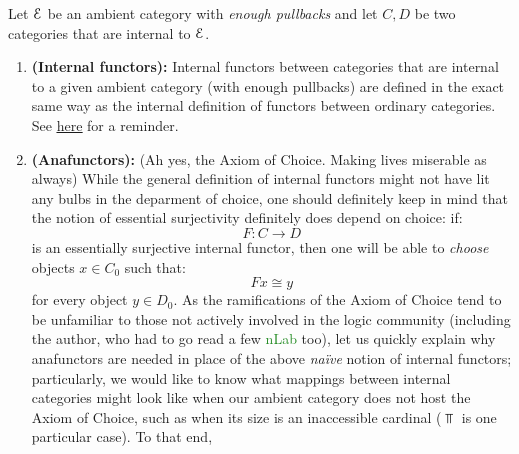                     \begin{definition} \label{def: internal_functors}
                        Let $\mathcal{E}$ be an ambient category with \textit{enough pullbacks} and let $C, D$ be two categories that are internal to $\mathcal{E}$.
                            \begin{enumerate}
                                \item \textbf{(Internal functors):} Internal functors between categories that are internal to a given ambient category (with enough pullbacks) are defined in the exact same way as the internal definition of functors between ordinary categories. See \href{https://ncatlab.org/nlab/show/functor#InternalDefinition}{\underline{here}} for a reminder.
                                \item \textbf{(Anafunctors):} (Ah yes, the Axiom of Choice. Making lives miserable as always) While the general definition of internal functors might not have lit any bulbs in the deparment of choice, one should definitely keep in mind that the notion of essential surjectivity definitely does depend on choice: if:
                                    $$F: C \to D$$
                                is an essentially surjective internal functor, then one will be able to \textit{choose} objects $x \in C_0$ such that:
                                    $$Fx \cong y$$
                                for every object $y \in D_0$. As the ramifications of the Axiom of Choice tend to be unfamiliar to those not actively involved in the logic community (including the author, who had to go read a few \textcolor{ForestGreen}{nLab} too), let us quickly explain why anafunctors are needed in place of the above \textit{na\"ive} notion of internal functors; particularly, we would like to know what mappings between internal categories might look like when our ambient category does not host the Axiom of Choice, such as when its size is an inaccessible cardinal ($\Top$ is one particular case). To that end, 
                                

\end{enumerate}
\end{definition}

